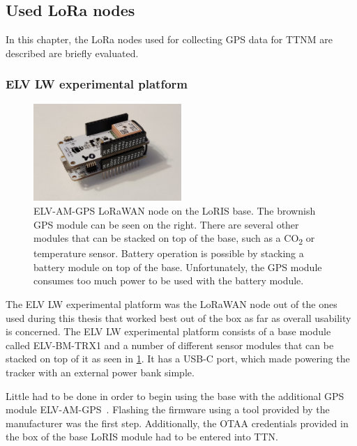 \subsection{Used \acs{LoRa} nodes}\label{subsec:used-lora-nodes}

In this chapter, the \ac{LoRa} nodes used for collecting \ac{GPS} data for \ac{TTNM} are described are briefly evaluated.

\subsubsection{ELV LW experimental platform}

\begin{figure}[htbp]
    \centering
    \includegraphics[width=0.5\textwidth]{pictures/hardware/gps-nodes/loris_bare.jpg}
    \caption{
        ELV-AM-GPS \ac{LoRaWAN} node on the LoRIS base.
        The brownish \ac{GPS} module can be seen on the right.
        There are several other modules that can be stacked on top of the base, such as a CO\textsubscript{2} or temperature sensor.
        Battery operation is possible by stacking a battery module on top of the base.
        Unfortunately, the \ac{GPS} module consumes too much power to be used with the battery module.
    }\label{pic:loris-node-bare}
\end{figure}

The ELV LW experimental platform was the \ac{LoRaWAN} node out of the ones used during this thesis that worked best out of the box as far as overall usability is concerned\cite{elv_elektronik_ag_elv-lw-base_2023}.
The ELV LW experimental platform consists of a base module called ELV-BM-TRX1 and a number of different sensor modules that can be stacked on top of it as seen in \cref{pic:loris-node-bare}.
It has a USB-C port, which made powering the tracker with an external power bank simple.

Little had to be done in order to begin using the base with the additional \ac{GPS} module ELV-AM-GPS~\cite{elv_elektronik_ag_elv-track_2022}.
Flashing the firmware using a tool provided by the manufacturer was the first step.
Additionally, the \ac{OTAA} credentials provided in the box of the base LoRIS module had to be entered into \ac{TTN}.

